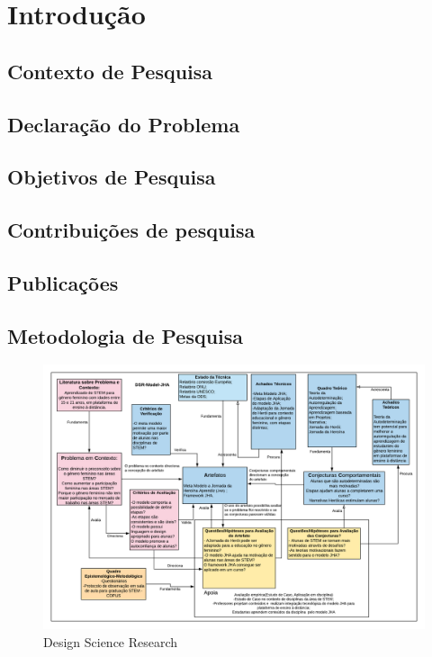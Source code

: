 \chapter{Introdução}

\section{Contexto de Pesquisa}

\section{Declaração do Problema}

\section{Objetivos de Pesquisa}


\section{Contribuições de pesquisa}


\section{Publicações}

\section{Metodologia de Pesquisa}

\begin{figure}
    \centering
    \includegraphics[width=.9\textwidth]{chaps/Images/DSRV2.png}
    \caption{Design Science Research}
    \label{fig:dsr}
\end{figure}

